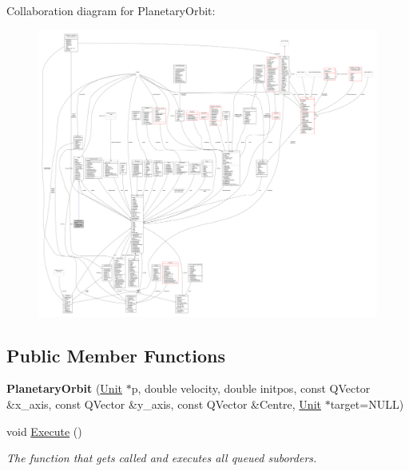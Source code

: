 Collaboration diagram for Planetary\+Orbit\+:
\nopagebreak
\begin{figure}[H]
\begin{center}
\leavevmode
\includegraphics[width=350pt]{df/d0c/classPlanetaryOrbit__coll__graph}
\end{center}
\end{figure}
\subsection*{Public Member Functions}
\begin{DoxyCompactItemize}
\item 
{\bfseries Planetary\+Orbit} (\hyperlink{classUnit}{Unit} $\ast$p, double velocity, double initpos, const Q\+Vector \&x\+\_\+axis, const Q\+Vector \&y\+\_\+axis, const Q\+Vector \&Centre, \hyperlink{classUnit}{Unit} $\ast$target=N\+U\+LL)\hypertarget{classPlanetaryOrbit_a56fb3d4e8455a723d21d2a0d751115d1}{}\label{classPlanetaryOrbit_a56fb3d4e8455a723d21d2a0d751115d1}

\item 
void \hyperlink{classPlanetaryOrbit_abc4db12aca3e9a4e50f140f80cbceae7}{Execute} ()\hypertarget{classPlanetaryOrbit_abc4db12aca3e9a4e50f140f80cbceae7}{}\label{classPlanetaryOrbit_abc4db12aca3e9a4e50f140f80cbceae7}

\begin{DoxyCompactList}\small\item\em The function that gets called and executes all queued suborders. \end{DoxyCompactList}\end{DoxyCompactItemize}
